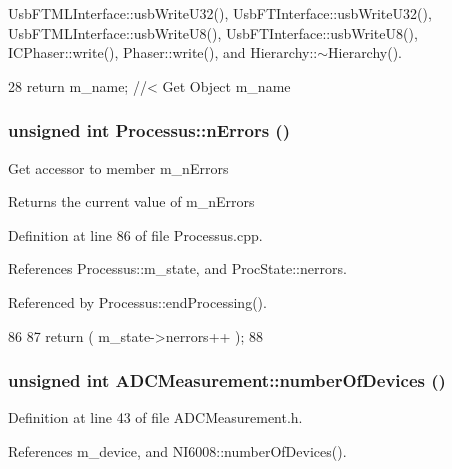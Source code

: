 UsbFTMLInterface::usbWriteU32(), UsbFTInterface::usbWriteU32(), UsbFTMLInterface::usbWriteU8(), UsbFTInterface::usbWriteU8(), ICPhaser::write(), Phaser::write(), and Hierarchy::$\sim$Hierarchy().


\begin{DoxyCode}
28 { return m_name; } //< Get Object m_name
\end{DoxyCode}
\hypertarget{classProcessus_a82a0487f82f07cc2c2dc2731f98149e7}{
\subsubsection[{nErrors}]{\setlength{\rightskip}{0pt plus 5cm}unsigned int Processus::nErrors ()}}
\label{classProcessus_a82a0487f82f07cc2c2dc2731f98149e7}
Get accessor to member m\_\-nErrors \begin{DoxyReturn}{Returns}
the current value of m\_\-nErrors 
\end{DoxyReturn}


Definition at line 86 of file Processus.cpp.

References Processus::m\_\-state, and ProcState::nerrors.

Referenced by Processus::endProcessing().


\begin{DoxyCode}
86                                 {
87   return ( m_state->nerrors++ );
88 }
\end{DoxyCode}
\hypertarget{classADCMeasurement_a7f91c4feea465de03bd017a005125177}{
\subsubsection[{numberOfDevices}]{\setlength{\rightskip}{0pt plus 5cm}unsigned int ADCMeasurement::numberOfDevices ()}}
\label{classADCMeasurement_a7f91c4feea465de03bd017a005125177}


Definition at line 43 of file ADCMeasurement.h.

References m\_\-device, and NI6008::numberOfDevices().


